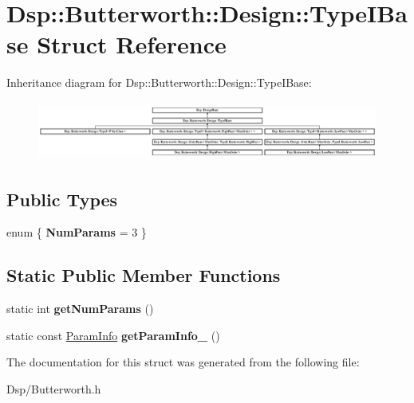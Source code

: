 \hypertarget{structDsp_1_1Butterworth_1_1Design_1_1TypeIBase}{\section{Dsp\-:\-:Butterworth\-:\-:Design\-:\-:Type\-I\-Base Struct Reference}
\label{structDsp_1_1Butterworth_1_1Design_1_1TypeIBase}
}
Inheritance diagram for Dsp\-:\-:Butterworth\-:\-:Design\-:\-:Type\-I\-Base\-:\begin{figure}[H]
\begin{center}
\leavevmode
\includegraphics[height=1.948504cm]{structDsp_1_1Butterworth_1_1Design_1_1TypeIBase}
\end{center}
\end{figure}
\subsection*{Public Types}
\begin{DoxyCompactItemize}
\item 
enum \{ {\bfseries Num\-Params} =  3
 \}
\end{DoxyCompactItemize}
\subsection*{Static Public Member Functions}
\begin{DoxyCompactItemize}
\item 
\hypertarget{structDsp_1_1Butterworth_1_1Design_1_1TypeIBase_afa43bd01a109c98985f465fe24cb4f30}{static int {\bfseries get\-Num\-Params} ()}\label{structDsp_1_1Butterworth_1_1Design_1_1TypeIBase_afa43bd01a109c98985f465fe24cb4f30}

\item 
\hypertarget{structDsp_1_1Butterworth_1_1Design_1_1TypeIBase_a36b883a0972b1c6a32efad9eb64f5f02}{static const \hyperlink{classDsp_1_1ParamInfo}{Param\-Info} {\bfseries get\-Param\-Info\-\_} ()}\label{structDsp_1_1Butterworth_1_1Design_1_1TypeIBase_a36b883a0972b1c6a32efad9eb64f5f02}

\end{DoxyCompactItemize}


The documentation for this struct was generated from the following file\-:\begin{DoxyCompactItemize}
\item 
Dsp/Butterworth.\-h\end{DoxyCompactItemize}
